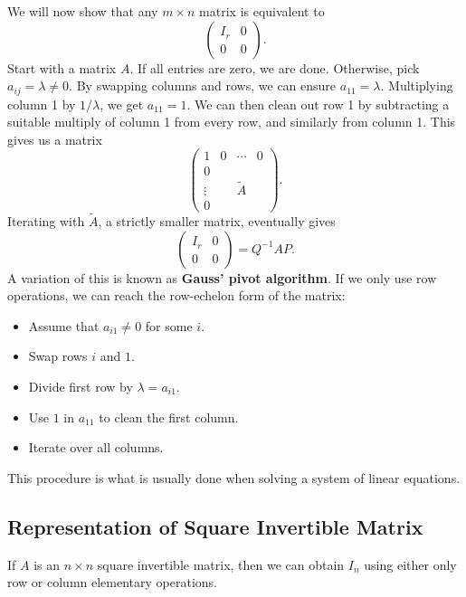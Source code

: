 \documentclass[12pt]{article}
\begin{document}
We will now show that any $m \times n$ matrix is equivalent to
\[
\begin{pmatrix}
	I_r & 0 \\
	0 & 0
\end{pmatrix}
.\]
Start with a matrix $A$. If all entries are zero, we are done. Otherwise, pick $a_{ij} = \lambda \neq 0$. By swapping columns and rows, we can ensure $a_{11} = \lambda$. Multiplying column 1 by $1/\lambda$, we get $a_{11} = 1$. We can then clean out row 1 by subtracting a suitable multiply of column 1 from every row, and similarly from column 1. This gives us a matrix
\[
\begin{pmatrix}
	1 & 0 & \cdots & 0 \\
	0 & & & \\
	\vdots & & \tilde A & \\
	0 & & &
\end{pmatrix}
.\]
Iterating with $\tilde A$, a strictly smaller matrix, eventually gives
\[
\begin{pmatrix}
	I_r & 0 \\
	0 & 0
\end{pmatrix} = Q^{-1}AP
.\]
A variation of this is known as \textbf{Gauss' pivot algorithm}. If we only use row operations, we can reach the row-echelon form of the matrix:
\begin{itemize}
	\item Assume that $a_{i1} \neq 0$ for some $i$.
	\item Swap rows $i$ and $1$.
	\item Divide first row by $\lambda = a_{i1}$.
	\item Use $1$ in $a_{11}$ to clean the first column.
	\item Iterate over all columns.
\end{itemize}
This procedure is what is usually done when solving a system of linear equations.

\subsection{Representation of Square Invertible Matrix}%
\label{sub:representation_of_square_invertible_matrix}

\begin{lemma}
	If $A$ is an $n \times n$ square invertible matrix, then we can obtain $I_n$ using either only row or column elementary operations.
\end{lemma}
\end{document}

